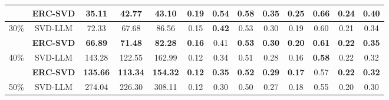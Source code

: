 \begin{table}[t]
{\begin{tabular}{c|c|ccc|cccccccc}
                               & \cellcolor{cyan!10} \textbf{ERC-SVD} & \cellcolor{cyan!10} \textbf{35.11} & \cellcolor{cyan!10} 42.77 & \cellcolor{cyan!10} \textbf{43.10} & \cellcolor{cyan!10} 0.19 & \cellcolor{cyan!10} \textbf{0.54} & \cellcolor{cyan!10} \textbf{0.58} & \cellcolor{cyan!10} \textbf{0.35} & \cellcolor{cyan!10} \textbf{0.25} & \cellcolor{cyan!10} \textbf{0.66} & \cellcolor{cyan!10} \textbf{0.24} & \cellcolor{cyan!10} \textbf{0.40} \\
    \midrule
    \multirow{2}{*}{30\%}
                               & \cellcolor{white} SVD-LLM & \cellcolor{white} 72.33 & \cellcolor{white} 67.68 & \cellcolor{white} 86.56 & \cellcolor{white} 0.15 & \cellcolor{white} \textbf{0.42} & \cellcolor{white} 0.53 & \cellcolor{white} 0.30 & \cellcolor{white} 0.19 & \cellcolor{white} 0.60 & \cellcolor{white} 0.21 & \cellcolor{white} 0.34 \\
                               
                               & \cellcolor{cyan!10} \textbf{ERC-SVD} & \cellcolor{cyan!10} \textbf{66.89} & \cellcolor{cyan!10} \textbf{71.48} & \cellcolor{cyan!10} \textbf{82.28} & \cellcolor{cyan!10} \textbf{0.16} & \cellcolor{cyan!10} 0.41 & \cellcolor{cyan!10} \textbf{0.53} & \cellcolor{cyan!10} \textbf{0.30} & \cellcolor{cyan!10} \textbf{0.20} & \cellcolor{cyan!10} \textbf{0.61} & \cellcolor{cyan!10} \textbf{0.22} & \cellcolor{cyan!10} \textbf{0.35} \\
    \midrule
    \multirow{2}{*}{40\%}
                               & \cellcolor{white} SVD-LLM & \cellcolor{white} 143.28 & \cellcolor{white} 122.55 & \cellcolor{white} 162.99 & \cellcolor{white} 0.12 & \cellcolor{white} 0.34 & \cellcolor{white} 0.51 & \cellcolor{white} 0.28 & \cellcolor{white} 0.16 & \cellcolor{white} \textbf{0.58} & \cellcolor{white} 0.22 & \cellcolor{white} 0.32 \\
                               
                               & \cellcolor{cyan!10} \textbf{ERC-SVD} & \cellcolor{cyan!10} \textbf{135.66} & \cellcolor{cyan!10} \textbf{113.34} & \cellcolor{cyan!10} \textbf{154.32} & \cellcolor{cyan!10} \textbf{0.12} & \cellcolor{cyan!10} \textbf{0.35} & \cellcolor{cyan!10} \textbf{0.52} & \cellcolor{cyan!10} \textbf{0.29} & \cellcolor{cyan!10} \textbf{0.17} & \cellcolor{cyan!10} 0.57 & \cellcolor{cyan!10} \textbf{0.22} & \cellcolor{cyan!10} \textbf{0.32} \\
    \midrule
    \multirow{2}{*}{50\%}
                               & \cellcolor{white} SVD-LLM & \cellcolor{white} 274.04 & \cellcolor{white} 226.30 & \cellcolor{white} 308.11 & \cellcolor{white} 0.12 & \cellcolor{white} 0.30 & \cellcolor{white} 0.50 & \cellcolor{white} 0.27 & \cellcolor{white} 0.18 & \cellcolor{white} 0.55 & \cellcolor{white} 0.20 & \cellcolor{white} 0.30 \\
                               

\end{tabular}}
\end{table}
